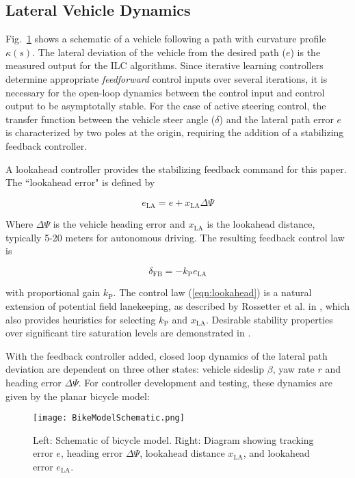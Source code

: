 \documentclass[letterpaper, 10 pt, conference]{ieeeconf}  %
\begin{document}
\subsection{Lateral Vehicle Dynamics}

Fig.~\ref{fig:bikemodel} shows a schematic of a vehicle following a path
with curvature profile $\kappa(s)$. The lateral deviation of the vehicle from the desired path ($e$) is the measured output for the ILC algorithms.
Since iterative learning controllers determine appropriate \textit{feedforward} control inputs over several iterations, it is necessary for the open-loop dynamics between the control input and
control output to be asymptotally stable. For the case of active steering control, the transfer function between the vehicle steer angle ($\delta$) and the lateral path error $e$ is
characterized by two poles at the origin, requiring the addition of a stabilizing feedback controller.

A lookahead controller provides the stabilizing feedback command for this paper. The ``lookahead error" is defined by 

\begin{equation}
	e_\mathrm{LA}=e+x_\mathrm{LA}\Delta\Psi
\end{equation}

Where $\Delta\Psi$ is the vehicle heading error and $x_\mathrm{LA}$ is the lookahead distance, typically 5-20 meters for autonomous driving.  The resulting feedback control law is

\begin{equation}
	\delta_\mathrm{FB} = -k_\mathrm{P}e_\mathrm{LA}
	\label{eqn:lookahead}
\end{equation}

with proportional gain $k_\mathrm{P}$. The control law (\ref{eqn:lookahead}) is a natural extension of potential field lanekeeping, as described by Rossetter et al. in \cite{rossetter2002}, which also provides heuristics for 
selecting $k_\mathrm{P}$ and $x_\mathrm{LA}$. Desirable stability properties over significant tire saturation levels are demonstrated in \cite{talvala}.

With the feedback controller added, closed loop dynamics of the lateral path deviation are dependent on three other states: vehicle sideslip $\beta$, yaw rate $r$ and heading error $\Delta\Psi$. For controller development
and testing, these dynamics are given by the planar bicycle model:

\begin{figure}
\centering
\texttt{[image: BikeModelSchematic.png]}
\caption{Left: Schematic of bicycle model. Right: Diagram showing tracking error $e$, heading error $\Delta\Psi$, lookahead distance $x_\mathrm{LA}$, and lookahead error $e_\mathrm{LA}$.}
\label{fig:bikemodel}
\end{figure}
\end{document}
